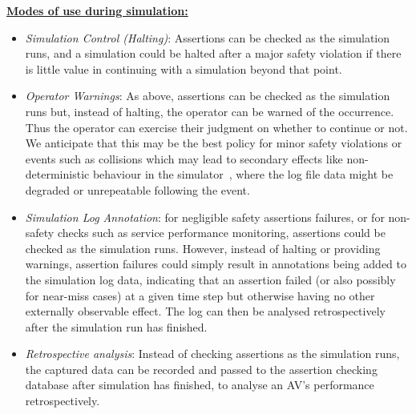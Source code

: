 
\underline{\textbf{Modes of use during simulation:}}
	
	\begin{itemize}
		\item \emph{Simulation Control (Halting)}: Assertions can be checked as the simulation runs, and a simulation could be halted after a major safety violation if there is little value in continuing with a simulation beyond that point.
		
		\item \emph{Operator Warnings}: %
		As above, assertions can be checked as the simulation runs but, instead of halting, the operator can be warned of the occurrence. Thus the operator can exercise their judgment on whether to continue or not. 
		We anticipate that this may be the best policy for minor safety violations or events such as collisions which may lead to secondary effects like non-deterministic behaviour in the simulator~\cite{chance2021}, where the log file data might be degraded or unrepeatable following the event. 
%
		\item \emph{Simulation Log Annotation}: for negligible safety assertions failures, or for non-safety checks such as service performance monitoring, assertions could be checked as the simulation runs. However, instead of halting or providing warnings, assertion failures could simply result in annotations being added to the simulation log data, indicating that an assertion failed (or also possibly for near-miss cases) at a given time step but otherwise having no other externally observable effect. The log can then be analysed retrospectively after the simulation run has finished.
		
		\item \emph{Retrospective analysis}: Instead of checking assertions as the simulation runs, the captured data can be recorded and passed to the assertion checking database after simulation has finished, to analyse an AV's performance retrospectively. %
	\end{itemize}

